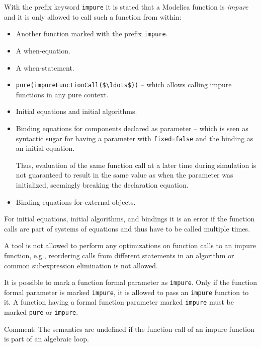 With the prefix keyword \lstinline!impure! it is stated that a Modelica function is \emph{impure} and it is only allowed to call such a function from within:
\begin{itemize}
\item
  Another function marked with the prefix \lstinline!impure!.
\item
  A when-equation.
\item
  A when-statement.
\item
  \lstinline!pure(impureFunctionCall($\ldots$))! -- which allows calling impure functions in any pure context.
\item
  Initial equations and initial algorithms.
\item
  Binding equations for components declared as parameter -- which is seen as syntactic sugar for having a parameter with \lstinline!fixed=false! and the binding as an initial equation.
  \begin{nonnormative}
  Thus, evaluation of the same function call at a later time during simulation is not guaranteed to result in the same value as when the parameter
  was initialized, seemingly breaking the declaration equation.
  \end{nonnormative}
\item
  Binding equations for external objects.
\end{itemize}

For initial equations, initial algorithms, and bindings it is an error
if the function calls are part of systems of equations and thus have to
be called multiple times.

\begin{nonnormative}
A tool is not allowed to perform any optimizations on function
calls to an impure function, e.g., reordering calls from different
statements in an algorithm or common subexpression elimination is not
allowed.
\end{nonnormative}

It is possible to mark a function formal parameter as \lstinline!impure!. Only if
the function formal parameter is marked \lstinline!impure!, it is allowed to pass an
\lstinline!impure! function to it. A function having a formal function parameter
marked \lstinline!impure! must be marked \lstinline!pure! or \lstinline!impure!.

\begin{nonnormative}
Comment: The semantics are undefined if the function call of an
impure function is part of an algebraic loop.
\end{nonnormative}

